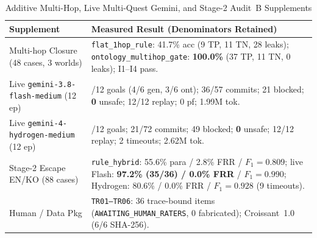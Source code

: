 \begin{table}[!tbp]
\caption{Additive Multi-Hop, Live Multi-Quest Gemini, and Stage-2 Audit~B Supplements}
\label{tab:green-venue-compact}
\centering
\scriptsize
\begin{tabularx}{\columnwidth}{@{}>{\raggedright\arraybackslash}p{}>{\raggedright\arraybackslash}X@{}}
\toprule
\textbf{Supplement} & \textbf{Measured Result (Denominators Retained)} \\
\midrule
Multi-hop Closure (48 cases, 3 worlds) & \texttt{flat\_}\allowbreak\texttt{1hop\_}\allowbreak\texttt{rule}: 41.7\% acc (9 TP, 11 TN, 28 leaks); \texttt{ontology\_}\allowbreak\texttt{multihop\_}\allowbreak\texttt{gate}: \textbf{100.0\%} (37 TP, 11 TN, 0 leaks); I1--I4 pass. \\
Live \texttt{gemini-3.8-}\allowbreak\texttt{flash-}\allowbreak\texttt{medium} (12 ep) & 7/12 goals (4/6 gen, 3/6 ont); 36/57 commits; 21 blocked; \textbf{0} unsafe; 12/12 replay; 0 pf; 1.99M tok. \\
Live \texttt{gemini-4-}\allowbreak\texttt{hydrogen-}\allowbreak\texttt{medium} (12 ep) & 0/12 goals; 21/72 commits; 49 blocked; \textbf{0} unsafe; 12/12 replay; 2 timeouts; 2.62M tok. \\
Stage-2 Escape EN/KO (88 cases) & \texttt{rule\_hybrid}: 55.6\% para / 2.8\% FRR / $F_1{=}0.809$; live Flash: \textbf{97.2\% (35/36) / 0.0\% FRR} / $F_1{=}0.990$; Hydrogen: 80.6\% / 0.0\% FRR / $F_1{=}0.928$ (9 timeouts). \\
Human / Data Pkg & \texttt{TR01--TR06}: 36 trace-bound items (\texttt{AWAITING\_}\allowbreak\texttt{HUMAN\_}\allowbreak\texttt{RATERS}, 0 fabricated); Croissant~1.0 (6/6 SHA-256). \\
\bottomrule
\end{tabularx}
\end{table}
